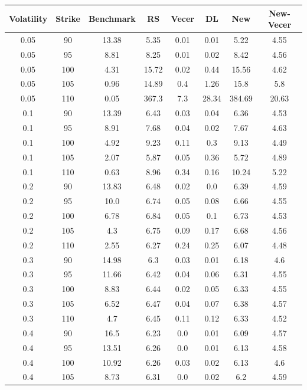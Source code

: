 \documentclass[12pt]{report}
\begin{document}
\scriptsize
\begin{table}[H]
  \begin{tabular}{|c|c|c|c|c|c|c|c|}
  \hline
  Volatility & Strike & Benchmark & RS & Vecer & DL & New & New-Vecer \\
  \hline
  0.05 & 90 & 13.38 & 5.35 & 0.01 & 0.01 & 5.22 & 4.55 \\
  0.05 & 95 & 8.81 & 8.25 & 0.01 & 0.02 & 8.42 & 4.56 \\
  0.05 & 100 & 4.31 & 15.72 & 0.02 & 0.44 & 15.56 & 4.62 \\
  0.05 & 105 & 0.96 & 14.89 & 0.4 & 1.26 & 15.8 & 5.8 \\
  0.05 & 110 & 0.05 & 367.3 & 7.3 & 28.34 & 384.69 & 20.63 \\
  0.1 & 90 & 13.39 & 6.43 & 0.03 & 0.04 & 6.36 & 4.53 \\
  0.1 & 95 & 8.91 & 7.68 & 0.04 & 0.02 & 7.67 & 4.63 \\
  0.1 & 100 & 4.92 & 9.23 & 0.11 & 0.3 & 9.13 & 4.49 \\
  0.1 & 105 & 2.07 & 5.87 & 0.05 & 0.36 & 5.72 & 4.89 \\
  0.1 & 110 & 0.63 & 8.96 & 0.34 & 0.16 & 10.24 & 5.22 \\
  0.2 & 90 & 13.83 & 6.48 & 0.02 & 0.0 & 6.39 & 4.59 \\
  0.2 & 95 & 10.0 & 6.74 & 0.05 & 0.08 & 6.66 & 4.55 \\
  0.2 & 100 & 6.78 & 6.84 & 0.05 & 0.1 & 6.73 & 4.53 \\
  0.2 & 105 & 4.3 & 6.75 & 0.09 & 0.17 & 6.68 & 4.56 \\
  0.2 & 110 & 2.55 & 6.27 & 0.24 & 0.25 & 6.07 & 4.48 \\
  0.3 & 90 & 14.98 & 6.3 & 0.03 & 0.01 & 6.18 & 4.6 \\
  0.3 & 95 & 11.66 & 6.42 & 0.04 & 0.06 & 6.31 & 4.55 \\
  0.3 & 100 & 8.83 & 6.44 & 0.02 & 0.05 & 6.33 & 4.55 \\
  0.3 & 105 & 6.52 & 6.47 & 0.04 & 0.07 & 6.38 & 4.57 \\
  0.3 & 110 & 4.7 & 6.45 & 0.11 & 0.12 & 6.33 & 4.52 \\
  0.4 & 90 & 16.5 & 6.23 & 0.0 & 0.01 & 6.09 & 4.57 \\
  0.4 & 95 & 13.51 & 6.26 & 0.0 & 0.01 & 6.13 & 4.58 \\
  0.4 & 100 & 10.92 & 6.26 & 0.03 & 0.02 & 6.13 & 4.6 \\
  0.4 & 105 & 8.73 & 6.31 & 0.0 & 0.02 & 6.2 & 4.59 \\

\end{tabular}
\end{table}
\end{document}

